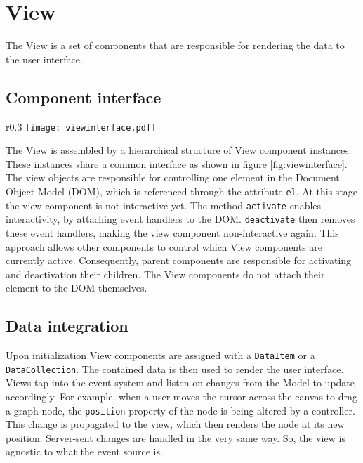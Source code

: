 \section{View}

The View is a set of components that are responsible for rendering the data to the user interface.

\subsection{Component interface}

\begin{wrapfigure}{r}{0.3\textwidth}
\texttt{[image: viewinterface.pdf]}
\caption{Class diagram of the View component interface}
\label{fig:viewinterface}
\end{wrapfigure}

The View is assembled by a hierarchical structure of View component instances. These instances share a common interface as shown in figure \ref{fig:viewinterface}. The view objects are responsible for controlling one element in the Document Object Model (DOM), which is referenced through the attribute \texttt{el}. At this stage the view component is not interactive yet. The method \texttt{activate} enables interactivity, by attaching event handlers to the DOM. \texttt{deactivate} then removes these event handlers, making the view component non-interactive again. This approach allows other components to control which View components are currently active. Consequently, parent components are responsible for activating and deactivation their children. The View components do not attach their element to the DOM themselves.

\subsection{Data integration}

Upon initialization View components are assigned with a \texttt{DataItem} or a \texttt{DataCollection}. The contained data is then used to render the user interface. Views tap into the event system and listen on changes from the Model to update accordingly. For example, when a user moves the cursor across the canvas to drag a graph node, the \texttt{position} property of the node is being altered by a controller. This change is propagated to the view, which then renders the node at its new position. Server-sent changes are handled in the very same way. So, the view is agnostic to what the event source is.

